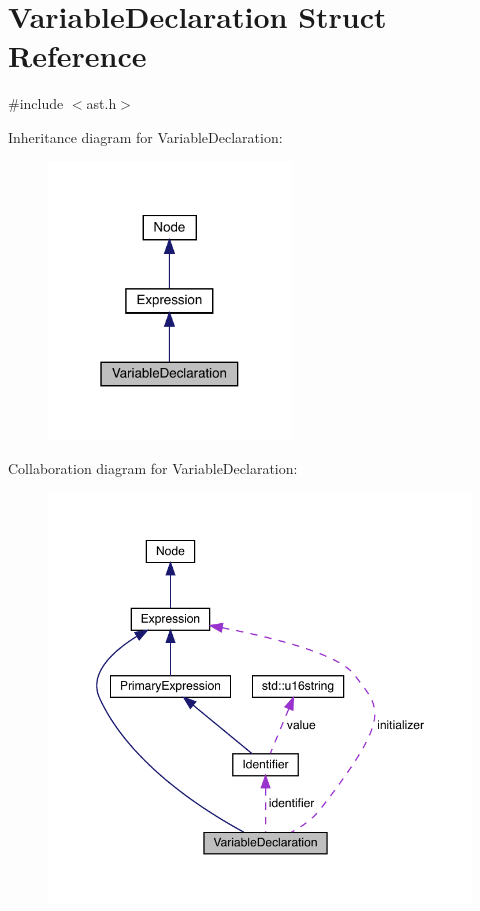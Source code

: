 \hypertarget{struct_variable_declaration}{}\section{Variable\+Declaration Struct Reference}
\label{struct_variable_declaration}


{\ttfamily \#include $<$ast.\+h$>$}



Inheritance diagram for Variable\+Declaration\+:\nopagebreak
\begin{figure}[H]
\begin{center}
\leavevmode
\includegraphics[width=183pt]{struct_variable_declaration__inherit__graph}
\end{center}
\end{figure}


Collaboration diagram for Variable\+Declaration\+:\nopagebreak
\begin{figure}[H]
\begin{center}
\leavevmode
\includegraphics[width=350pt]{struct_variable_declaration__coll__graph}
\end{center}
\end{figure}
